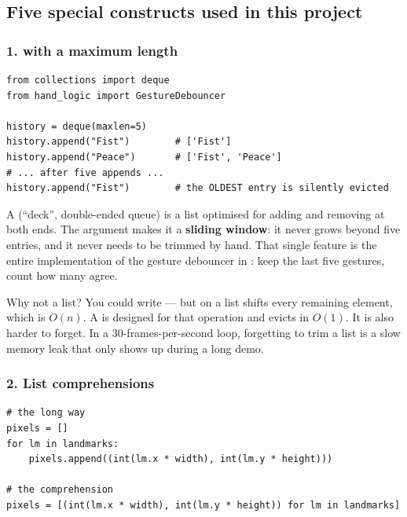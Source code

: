 \subsection{Five special constructs used in this project}

\subsubsection*{1.  with a maximum length}

\begin{codecard}
\begin{lstlisting}
from collections import deque
from hand_logic import GestureDebouncer

history = deque(maxlen=5)
history.append("Fist")        # ['Fist']
history.append("Peace")       # ['Fist', 'Peace']
# ... after five appends ...
history.append("Fist")        # the OLDEST entry is silently evicted
\end{lstlisting}
\end{codecard}

A  (``deck'', double-ended queue) is a list optimised for adding and removing at both
ends. The  argument makes it a \textbf{sliding window}: it never grows beyond five
entries, and it never needs to be trimmed by hand. That single feature is the entire implementation of
the gesture debouncer in : keep the last five gestures, count how many agree.

\begin{pythonconcept}{Why not a list?}
You could write  --- but
 on a list shifts every remaining element, which is $O(n)$. A  is designed
for that operation and evicts in $O(1)$. It is also harder to forget. In a 30-frames-per-second
loop, forgetting to trim a list is a slow memory leak that only shows up during a long demo.
\end{pythonconcept}

\subsubsection*{2. List comprehensions}

\begin{codecard}
\begin{lstlisting}
# the long way
pixels = []
for lm in landmarks:
    pixels.append((int(lm.x * width), int(lm.y * height)))

# the comprehension
pixels = [(int(lm.x * width), int(lm.y * height)) for lm in landmarks]
\end{lstlisting}
\end{codecard}

